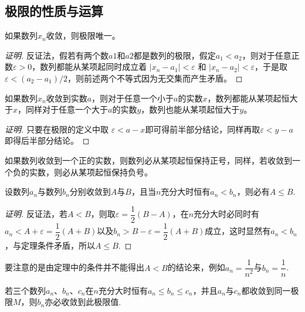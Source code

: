 \subsection{极限的性质与运算}
\label{sec:properties-and-operation-of-limit}

\begin{theorem}[极限唯一性]
  如果数列$x_n$收敛，则极限唯一。
\end{theorem}

\begin{proof}[证明]
  反证法，假若有两个数$a1$和$a2$都是数列的极限，假定$a_1<a_2$，则对于任意正数$\varepsilon > 0$，数列都能从某项起同时成立着 $|x_n-a_1| < \varepsilon$ 和 $|x_n-a_2| < \varepsilon$，于是取$\varepsilon < (a_2-a_1)/2$，则前述两个不等式因为无交集而产生矛盾。
\end{proof}

\begin{theorem}
  如果数列$x_n$收敛到实数$a$，则对于任意一个小于$a$的实数$x$，数列都能从某项起恒大于$x$，同样对于任意一个大于$a$的实数$y$，数列也能从某项起恒大于$y$。
\end{theorem}

\begin{proof}[证明]
  只要在极限的定义中取 $\varepsilon < a-x$即可得前半部分结论，同样再取$\varepsilon < y-a$即得后半部分结论。
\end{proof}

\begin{inference}[保号性]
  如果数列收敛到一个正的实数，则数列必从某项起恒保持正号，同样，若收敛到一个负的实数，则必从某项起恒保持负号。
\end{inference}

\begin{theorem}[保不等式性]
  设数列$a_n$与数列$b_n$分别收敛到$A$与$B$，且当$n$充分大时恒有$a_n<b_n$，则必有$A \leqslant B$.
\end{theorem}

\begin{proof}[证明]
  反证法，若$A<B$，则取$\varepsilon=\dfrac{1}{2}(B-A)$，在$n$充分大时必同时有$a_n<A+\varepsilon=\dfrac{1}{2}(A+B)$以及$b_n>B-\varepsilon=\dfrac{1}{2}(A+B)$成立，这时显然有$a_n<b_n$，与定理条件矛盾，所以$A \leqslant B$.
\end{proof}

要注意的是由定理中的条件并不能得出$A<B$的结论来，例如$a_n=\dfrac{1}{n^2}$与$b_n=\dfrac{1}{n}$.

\begin{theorem}
 若三个数列$a_n$、$b_n$、$c_n$在$n$充分大时恒有$a_n \leqslant b_n \leqslant c_n$，并且$a_n$与$c_n$都收敛到同一极限$M$，则$b_n$亦必收敛到此极限值. 
\end{theorem}

